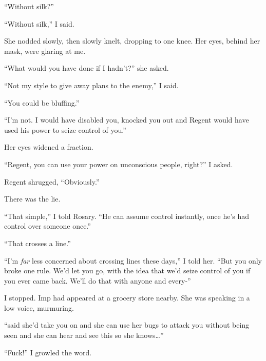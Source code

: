 ``Without silk?''



``Without silk,'' I said.



She nodded slowly, then slowly knelt, dropping to one knee.  Her eyes, behind her mask, were glaring at me.



``What would you have done if I hadn't?'' she asked.



``Not my style to give away plans to the enemy,'' I said.



``You could be bluffing.''



``I'm not.  I would have disabled you, knocked you out and Regent would have used his power to seize control of you.''



Her eyes widened a fraction.



``Regent, you can use your power on unconscious people, right?'' I asked.



Regent shrugged, ``Obviously.''



There was the lie.



``That simple,'' I told Rosary.  ``He can assume control instantly, once he's had control over someone once.''



``That crosses a line.''



``I'm \emph{far} less concerned about crossing lines these days,'' I told her.  ``But you only broke one rule.  We'd let you go, with the idea that we'd seize control of you if you ever came back.  We'll do that with anyone and every-''



I stopped.  Imp had appeared at a grocery store nearby.  She was speaking in a low voice, murmuring.



``\ldotsSkitter said she'd take you on and she can use her bugs to attack you without being seen and she can hear and see this so she knows\ldots''



``Fuck!'' I growled the word.



